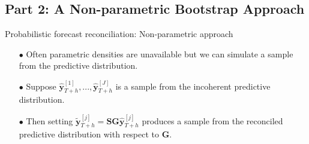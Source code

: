 \documentclass[11pt,xcolor=dvipsnames,table]{beamer} %
\begin{document}

\subsection{Part 2: A Non-parametric Bootstrap Approach }


\begin{frame}[noframenumbering]{Probabilistic forecast reconciliation: Non-parametric approach}
\begin{itemize}[<+-| alert@+>]
	\item [$\bullet$] Often parametric densities are unavailable but we can simulate a sample from the predictive distribution.
	\item[]
	\item [$\bullet$] Suppose $\hat{\bm y}^{[1]}_{T+h},...,\hat{\bm y}^{[J]}_{T+h}$ is a sample from the incoherent predictive distribution.
	\item[]
	\item [$\bullet$] Then setting $\tilde{\bm y}^{[j]}_{T+h}=\bm{SG}\hat{\bm y}^{[j]}_{T+h}$ produces a sample from the reconciled predictive distribution with respect to $\bm{G}$.
\end{itemize}    
\end{frame}

\end{document}
